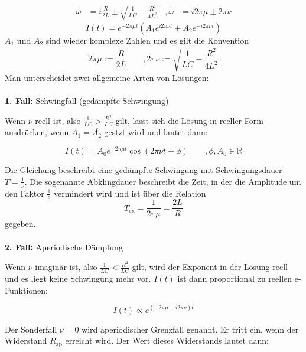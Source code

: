 \begin{align*}
    \tilde{\omega} &= i \frac{R}{2L} \pm \sqrt{\frac{1}{LC}- \frac{R^2}{4L^2}} & ,\tilde{\omega} &= i2 \pi \mu \pm 2\pi \nu
\end{align*}
\begin{equation}
    \label{eqn:RLC_lsg}
    I(t) = e^{-2 \pi \mu t} (A_1e^{i2 \pi \nu t} + A_2e^{-i2 \pi \nu t})
\end{equation}
$A_1$ und $A_2$ sind wieder komplexe Zahlen und es gilt die Konvention 
\begin{equation*}
    2\pi \mu := \frac{R}{2L} \qquad , 2\pi \nu := \sqrt{\frac{1}{LC}- \frac{R^2}{4L^2}}
\end{equation*}
Man unterscheidet zwei allgemeine Arten von Lösungen:\\
\\
\textbf{1. Fall:} Schwingfall (gedämpfte Schwingung)

Wenn $\nu$ reell ist, also $\frac{1}{LC} > \frac{R^2}{LC}$ gilt, lässt sich die Lösung 
in reeller Form ausdrücken, wenn $A_1 = \overline{A_2}$ gestzt wird und lautet dann:

\begin{equation}
    I(t) = A_0e^{-2\pi \mu t}\cos(2\pi \nu t + \phi) \qquad , \phi, A_0 \in \mathbb{R}
\end{equation}

Die Gleichung beschreibt eine gedämpfte Schwingung mit Schwingungsdauer $T = \frac{1}{\nu}$.
Die sogenannte Abklingdauer beschreibt die Zeit, in der die Amplitude um den Faktor $\frac{1}{e}$ vermindert
wird und ist über die Relation 
\begin{equation}
    \label{eqn:T_ex}
    T_\text{ex} = \frac{1}{2\pi\mu} = \frac{2L}{R}
\end{equation}
gegeben. \\
\\
\textbf{2. Fall:} Aperiodische Dämpfung

Wenn $\nu$ imaginär ist, also $\frac{1}{LC} < \frac{R^2}{LC}$ gilt, wird der Exponent in der Lösung reell
und es liegt keine Schwingung mehr vor. $I(t)$ ist dann proportional zu reellen e-Funktionen:

\begin{equation}
    I(t) \propto e^{(-2\pi\mu-i2\pi\nu)t}
\end{equation}

Der Sonderfall $\nu = 0$ wird aperiodischer Grenzfall genannt. Er tritt ein, wenn der Widerstand $R_\text{ap}$
erreicht wird. Der Wert dieses Widerstands lautet dann:

